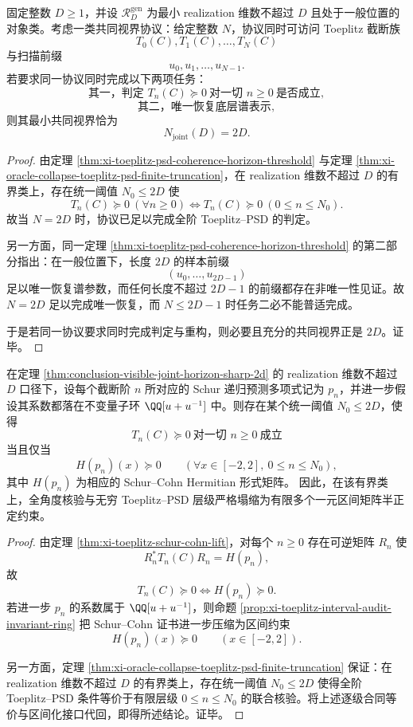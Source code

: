 \begin{theorem}\label{thm:conclusion-visible-joint-horizon-sharp-2d}
固定整数 \(D\ge 1\)，并设 \(\mathcal R_D^{\mathrm{gen}}\) 为最小 realization 维数不超过 \(D\) 且处于一般位置的对象类。考虑一类共同视界协议：给定整数 \(N\)，协议同时可访问 Toeplitz 截断族
\[
T_0(C),T_1(C),\dots,T_N(C)
\]
与扫描前缀
\[
u_0,u_1,\dots,u_{N-1}.
\]
若要求同一协议同时完成以下两项任务：
\[
\text{其一，判定 }T_n(C)\succeq 0\ \text{对一切 }n\ge 0\ \text{是否成立},
\]
\[
\text{其二，唯一恢复底层谱表示},
\]
则其最小共同视界恰为
\[
N_{\mathrm{joint}}(D)=2D.
\]
\end{theorem}
\begin{proof}
由定理 \ref{thm:xi-toeplitz-psd-coherence-horizon-threshold} 与定理 \ref{thm:xi-oracle-collapse-toeplitz-psd-finite-truncation}，在 realization 维数不超过 \(D\) 的有界类上，存在统一阈值 \(N_0\le 2D\) 使
\[
T_n(C)\succeq 0\ (\forall n\ge 0)
\iff
T_n(C)\succeq 0\ (0\le n\le N_0).
\]
故当 \(N=2D\) 时，协议已足以完成全阶 Toeplitz--PSD 的判定。

另一方面，同一定理 \ref{thm:xi-toeplitz-psd-coherence-horizon-threshold} 的第二部分指出：在一般位置下，长度 \(2D\) 的样本前缀
\[
(u_0,\dots,u_{2D-1})
\]
足以唯一恢复谱参数，而任何长度不超过 \(2D-1\) 的前缀都存在非唯一性见证。故 \(N=2D\) 足以完成唯一恢复，而 \(N\le 2D-1\) 时任务二必不能普适完成。

于是若同一协议要求同时完成判定与重构，则必要且充分的共同视界正是 \(2D\)。证毕。
\end{proof}

\begin{theorem}\label{thm:conclusion-visible-all-angle-interval-psd-collapse}
在定理 \ref{thm:conclusion-visible-joint-horizon-sharp-2d} 的 realization 维数不超过 \(D\) 口径下，设每个截断阶 \(n\) 所对应的 Schur 递归预测多项式记为 \(p_n\)，并进一步假设其系数都落在不变量子环 \(\QQ[u+u^{-1}]\) 中。则存在某个统一阈值 \(N_0\le 2D\)，使得
\[
T_n(C)\succeq 0\ \text{对一切 }n\ge 0\ \text{成立}
\]
当且仅当
\[
H(p_n)(x)\succeq 0
\qquad
(\forall x\in[-2,2],\ 0\le n\le N_0),
\]
其中 \(H(p_n)\) 为相应的 Schur--Cohn Hermitian 形式矩阵。
因此，在该有界类上，全角度核验与无穷 Toeplitz--PSD 层级严格塌缩为有限多个一元区间矩阵半正定约束。
\end{theorem}
\begin{proof}
由定理 \ref{thm:xi-toeplitz-schur-cohn-lift}，对每个 \(n\ge 0\) 存在可逆矩阵 \(R_n\) 使
\[
R_n^\ast T_n(C)R_n=H(p_n),
\]
故
\[
T_n(C)\succeq 0
\iff
H(p_n)\succeq 0.
\]
若进一步 \(p_n\) 的系数属于 \(\QQ[u+u^{-1}]\)，则命题 \ref{prop:xi-toeplitz-interval-audit-invariant-ring} 把 Schur--Cohn 证书进一步压缩为区间约束
\[
H(p_n)(x)\succeq 0
\qquad(x\in[-2,2]).
\]

另一方面，定理 \ref{thm:xi-oracle-collapse-toeplitz-psd-finite-truncation} 保证：在 realization 维数不超过 \(D\) 的有界类上，存在统一阈值 \(N_0\le 2D\) 使得全阶 Toeplitz--PSD 条件等价于有限层级 \(0\le n\le N_0\) 的联合核验。将上述逐级合同等价与区间化接口代回，即得所述结论。证毕。
\end{proof}

